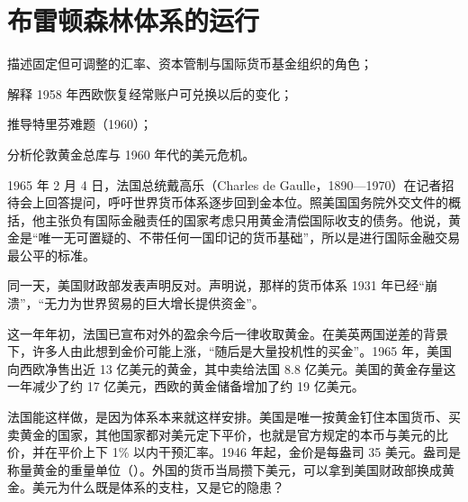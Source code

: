 \chapter{布雷顿森林体系的运行}\label{ch:brettonwoods}

\begin{chapterguide}
\begin{guidegoals}
\item 描述固定但可调整的汇率、资本管制与国际货币基金组织的角色；
\item 解释 1958 年西欧恢复经常账户可兑换以后的变化；
\item 推导特里芬难题（1960）；
\item 分析伦敦黄金总库与 1960 年代的美元危机。
\end{guidegoals}
\end{chapterguide}

1965 年 2 月 4 日，法国总统戴高乐（Charles de Gaulle，1890—1970）在记者招待会上回答提问，呼吁世界货币体系逐步回到金本位\cite{frus36,loc36}。照美国国务院外交文件的概括，他主张负有国际金融责任的国家考虑只用黄金清偿国际收支的债务\cite{frus36}。他说，黄金是“唯一无可置疑的、不带任何一国印记的货币基础”，所以是进行国际金融交易最公平的标准\cite{frus36}。

同一天，美国财政部发表声明反对。声明说，那样的货币体系 1931 年已经“崩溃”，“无力为世界贸易的巨大增长提供资金”\cite{frus36}。

这一年年初，法国已宣布对外的盈余今后一律收取黄金\cite{bis36}。在美英两国逆差的背景下，许多人由此想到金价可能上涨，“随后是大量投机性的买金”\cite{bis36}。1965 年，美国向西欧净售出近 13 亿美元的黄金，其中卖给法国 8.8 亿美元\cite{bis36}。美国的黄金存量这一年减少了约 17 亿美元，西欧的黄金储备增加了约 19 亿美元\cite{bis36}。

法国能这样做，是因为体系本来就这样安排。美国是唯一按黄金钉住本国货币、买卖黄金的国家，其他国家都对美元定下平价，也就是官方规定的本币与美元的比价，并在平价上下 1\% 以内干预汇率\cite{bordo1993}。1946 年起，金价是每盎司 35 美元\cite{bordo1993}。盎司是称量黄金的重量单位（）。外国的货币当局攒下美元，可以拿到美国财政部换成黄金\cite{bordo1993}。美元为什么既是体系的支柱，又是它的隐患？

